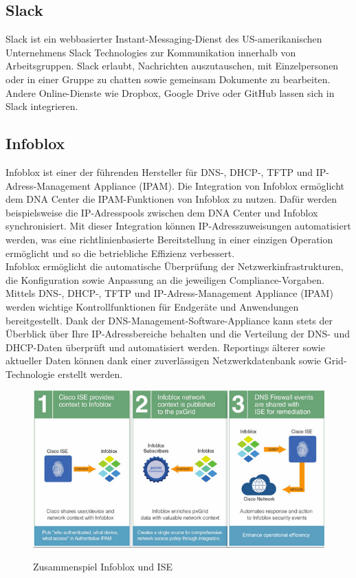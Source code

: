 \subsection{Slack}
Slack ist ein webbasierter Instant-Messaging-Dienst des US-amerikanischen Unternehmens Slack Technologies zur Kommunikation innerhalb von Arbeitsgruppen. Slack erlaubt, Nachrichten auszutauschen, mit Einzelpersonen oder in einer Gruppe zu chatten sowie gemeinsam Dokumente zu bearbeiten. Andere Online-Dienste wie Dropbox, Google Drive oder GitHub lassen sich in Slack integrieren.

\subsection{Infoblox}
Infoblox ist einer der führenden Hersteller für DNS-, DHCP-, TFTP und IP-Adress-Management Appliance (IPAM). Die Integration von Infoblox ermöglicht dem DNA Center die IPAM-Funktionen von Infoblox zu nutzen. Dafür werden beispielsweise die IP-Adresspools zwischen dem DNA Center und Infoblox synchronisiert. Mit dieser Integration können IP-Adresszuweisungen automatisiert werden, was eine richtlinienbasierte Bereitstellung in einer einzigen Operation ermöglicht und so die betriebliche Effizienz verbessert. \\
Infoblox ermöglicht die automatische Überprüfung der Netzwerkinfrastrukturen, die Konfiguration sowie Anpassung an die jeweiligen Compliance-Vorgaben. Mittels DNS-, DHCP-, TFTP und IP-Adress-Management Appliance (IPAM) werden wichtige Kontrollfunktionen für Endgeräte und Anwendungen bereitgestellt. Dank der DNS-Management-Software-Appliance kann stets der Überblick über Ihre IP-Adressbereiche behalten und die Verteilung der DNS- und DHCP-Daten überprüft und automatisiert werden. Reportings älterer sowie aktueller Daten können dank einer zuverlässigen Netzwerkdatenbank sowie Grid-Technologie erstellt werden.\cite{infoblox} \\

\begin{figure}[H]
	\centering
	\includegraphics[width=0.7\linewidth]{img/infoblox-ise.png}\\[1px]
	\caption{Zusammenspiel Infoblox und ISE}
	\label{fig:Zusammenspiel Infoblox und ISE}
\end{figure}

